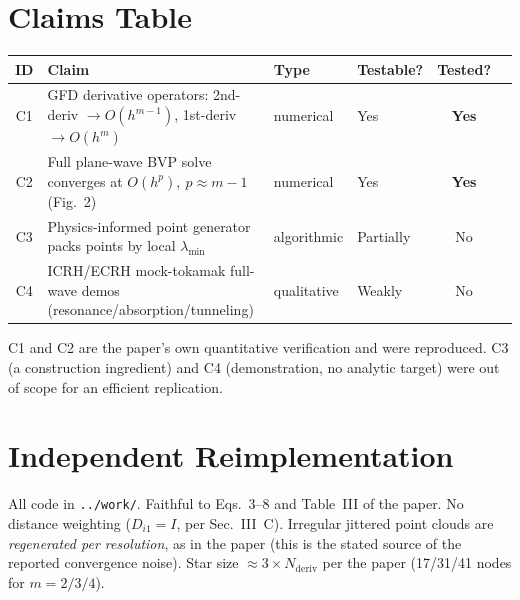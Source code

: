 \documentclass[11pt]{article}
\begin{document}
\section{Claims Table}
\begin{center}\small
\begin{tabular}{clllcc}
\toprule
ID & Claim & Type & Testable? & Tested? \\
\midrule
C1 & GFD derivative operators: 2nd-deriv $\to O(h^{m-1})$, 1st-deriv $\to O(h^{m})$
   & numerical & Yes & \textbf{Yes} \\
C2 & Full plane-wave BVP solve converges at $O(h^{p}),\ p\approx m-1$ (Fig.~2)
   & numerical & Yes & \textbf{Yes} \\
C3 & Physics-informed point generator packs points by local $\lambda_{\min}$
   & algorithmic & Partially & No \\
C4 & ICRH/ECRH mock-tokamak full-wave demos (resonance/absorption/tunneling)
   & qualitative & Weakly & No \\
\bottomrule
\end{tabular}
\end{center}
C1 and C2 are the paper's own quantitative verification and were reproduced.
C3 (a construction ingredient) and C4 (demonstration, no analytic target)
were out of scope for an efficient replication.

\section{Independent Reimplementation}
All code in \texttt{../work/}. Faithful to Eqs.~3--8 and Table~III of the
paper. No distance weighting ($D_{i1}=I$, per Sec.~III~C). Irregular jittered
point clouds are \emph{regenerated per resolution}, as in the paper (this is
the stated source of the reported convergence noise). Star size
$\approx 3\times N_\mathrm{deriv}$ per the paper (17/31/41 nodes for $m=2/3/4$).
\end{document}
